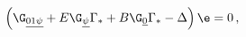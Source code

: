 \begin{equation}  \label{ALEkappa}
\left(\G_{\underline{01\psi}}+E \G_{\underline{\psi}}\Gamma
_*+B\G_{\underline{0}}\Gamma _* - \Delta \right)\e=0 \,,
\end{equation}


